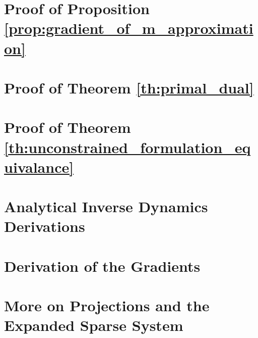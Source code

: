 \section{Proof of Proposition \ref{prop:gradient_of_m_approximation}}
\label{app:gradient_of_m_approximation}


\section{Proof of Theorem \ref{th:primal_dual}}
\label{app:primal_dual_proof}


\section{Proof of Theorem \ref{th:unconstrained_formulation_equivalance}}
\label{app:unconstrained_formulation_equivalance}


\section{Analytical Inverse Dynamics Derivations}
\label{app:analytical_inverse_dynamics_derivations}


\section{Derivation of the Gradients}
\label{app:gradients_derivation}


\section{More on Projections and the Expanded Sparse System}
\label{app:more_on_projections}

